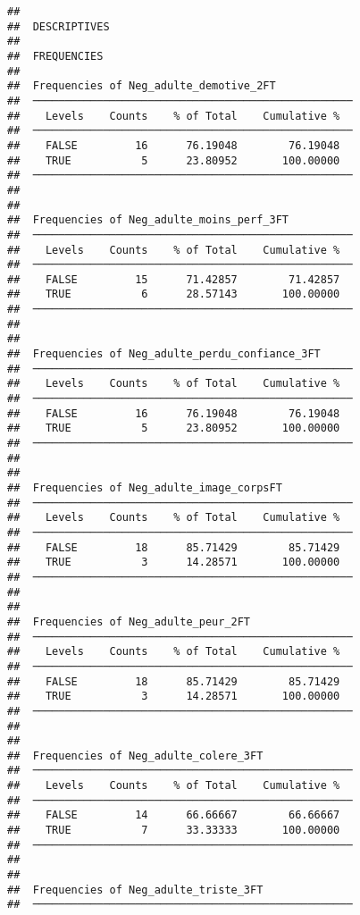 \documentclass[
]{article}
\begin{document}
\begin{verbatim}
## 
##  DESCRIPTIVES
## 
##  FREQUENCIES
## 
##  Frequencies of Neg_adulte_demotive_2FT             
##  ────────────────────────────────────────────────── 
##    Levels    Counts    % of Total    Cumulative %   
##  ────────────────────────────────────────────────── 
##    FALSE         16      76.19048        76.19048   
##    TRUE           5      23.80952       100.00000   
##  ────────────────────────────────────────────────── 
## 
## 
##  Frequencies of Neg_adulte_moins_perf_3FT           
##  ────────────────────────────────────────────────── 
##    Levels    Counts    % of Total    Cumulative %   
##  ────────────────────────────────────────────────── 
##    FALSE         15      71.42857        71.42857   
##    TRUE           6      28.57143       100.00000   
##  ────────────────────────────────────────────────── 
## 
## 
##  Frequencies of Neg_adulte_perdu_confiance_3FT      
##  ────────────────────────────────────────────────── 
##    Levels    Counts    % of Total    Cumulative %   
##  ────────────────────────────────────────────────── 
##    FALSE         16      76.19048        76.19048   
##    TRUE           5      23.80952       100.00000   
##  ────────────────────────────────────────────────── 
## 
## 
##  Frequencies of Neg_adulte_image_corpsFT            
##  ────────────────────────────────────────────────── 
##    Levels    Counts    % of Total    Cumulative %   
##  ────────────────────────────────────────────────── 
##    FALSE         18      85.71429        85.71429   
##    TRUE           3      14.28571       100.00000   
##  ────────────────────────────────────────────────── 
## 
## 
##  Frequencies of Neg_adulte_peur_2FT                 
##  ────────────────────────────────────────────────── 
##    Levels    Counts    % of Total    Cumulative %   
##  ────────────────────────────────────────────────── 
##    FALSE         18      85.71429        85.71429   
##    TRUE           3      14.28571       100.00000   
##  ────────────────────────────────────────────────── 
## 
## 
##  Frequencies of Neg_adulte_colere_3FT               
##  ────────────────────────────────────────────────── 
##    Levels    Counts    % of Total    Cumulative %   
##  ────────────────────────────────────────────────── 
##    FALSE         14      66.66667        66.66667   
##    TRUE           7      33.33333       100.00000   
##  ────────────────────────────────────────────────── 
## 
## 
##  Frequencies of Neg_adulte_triste_3FT               
##  ────────────────────────────────────────────────── 

\end{verbatim}
\end{document}
